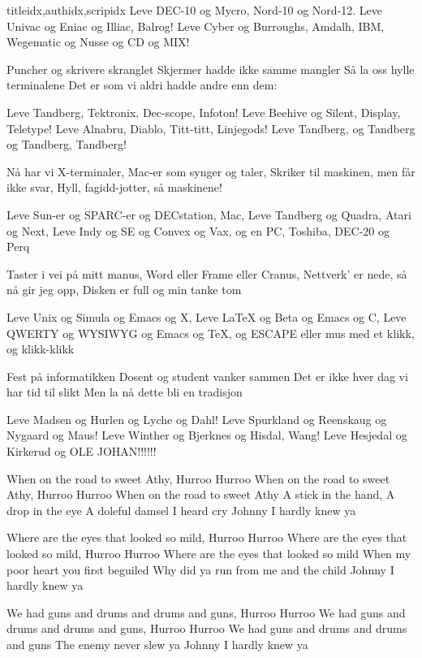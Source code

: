 \documentclass[14pt,letterpaper,norsk]{article}
\begin{document}
\begin{songs}{titleidx,authidx,scripidx}
\beginchorus
Leve DEC-10 og Mycro, Nord-10 og Nord-12.
Leve Univac og Eniac og Illiac, Balrog!
Leve Cyber og Burroughs, Amdalh, IBM,
Wegematic og Nusse og CD og MIX!
\endchorus

\beginverse
Puncher og skrivere skranglet
Skjermer hadde ikke samme mangler
Så la oss hylle terminalene
Det er som vi aldri hadde andre enn dem:
\endverse

\beginchorus
Leve Tandberg, Tektronix, Dec-scope, Infoton!
Leve Beehive og Silent, Display, Teletype!
Leve Alnabru, Diablo, Titt-titt, Linjegods!
Leve Tandberg, og Tandberg og Tandberg, Tandberg!
\endchorus

\beginverse
Nå har vi X-terminaler,
Mac-er som synger og taler,
Skriker til maskinen, men får ikke svar,
Hyll, fagidd-jotter, så maskinene!
\endverse

\beginchorus
Leve Sun-er og SPARC-er og DECstation, Mac,
Leve Tandberg og Quadra, Atari og Next,
Leve Indy og SE og Convex og Vax,
og en PC, Toshiba, DEC-20 og Perq
\endchorus

\beginverse
Taster i vei på mitt manus,
Word eller Frame eller Cranus,
Nettverk' er nede, så nå gir jeg opp,
Disken er full og min tanke tom
\endverse

\beginchorus
Leve Unix og Simula og Emacs og X,
Leve \LaTeX{} og Beta og Emacs og C,
Leve QWERTY og WYSIWYG og Emacs og \TeX{},
og ESCAPE eller mus med et klikk, og klikk-klikk
\endchorus

\beginverse
Fest på informatikken
Dosent og student vanker sammen
Det er ikke hver dag vi har tid til slikt
Men la nå dette bli en tradisjon
\endverse

\beginchorus
Leve Madsen og Hurlen og Lyche og Dahl!
Leve Spurkland og Reenskaug og Nygaard og Maus!
Leve Winther og Bjerknes og Hisdal, Wang!
Leve Hesjedal og Kirkerud og OLE JOHAN!!!!!!
\endchorus
\endsong

\beginverse
When on the road to sweet Athy,
Hurroo Hurroo
When on the road to sweet Athy,
Hurroo Hurroo
When on the road to sweet Athy
A stick in the hand, A drop in the eye
A doleful damsel I heard cry
Johnny I hardly knew ya
\endverse

\beginverse
Where are the eyes that looked so mild,
Hurroo Hurroo
Where are the eyes that looked so mild,
Hurroo Hurroo
Where are the eyes that looked so mild
When my poor heart you first beguiled
Why did ya run from me and the child
Johnny I hardly knew ya
\endverse

\beginchorus
We had guns and drums and drums and guns,
Hurroo Hurroo
We had guns and drums and drums and guns,
Hurroo Hurroo
We had guns and drums and drums and guns
The enemy never slew ya
Johnny I hardly knew ya
\endchorus


\end{songs}
\end{document}
